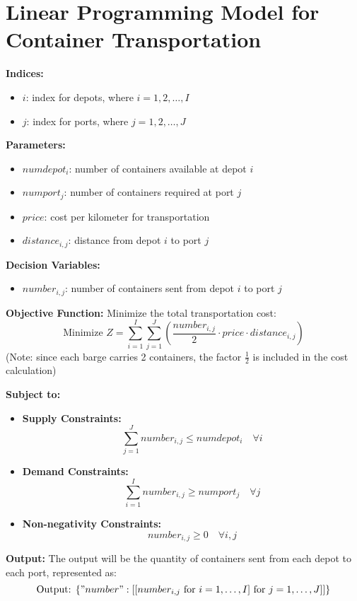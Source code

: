 \documentclass{article}
\begin{document}
\section*{Linear Programming Model for Container Transportation}

\textbf{Indices:}
\begin{itemize}
    \item $i$: index for depots, where $i = 1, 2, \ldots, I$
    \item $j$: index for ports, where $j = 1, 2, \ldots, J$
\end{itemize}

\textbf{Parameters:}
\begin{itemize}
    \item $numdepot_i$: number of containers available at depot $i$
    \item $numport_j$: number of containers required at port $j$
    \item $price$: cost per kilometer for transportation
    \item $distance_{i,j}$: distance from depot $i$ to port $j$
\end{itemize}

\textbf{Decision Variables:}
\begin{itemize}
    \item $number_{i,j}$: number of containers sent from depot $i$ to port $j$
\end{itemize}

\textbf{Objective Function:}
Minimize the total transportation cost:
\[
\text{Minimize } Z = \sum_{i=1}^{I} \sum_{j=1}^{J} \left( \frac{number_{i,j}}{2} \cdot price \cdot distance_{i,j} \right)
\]
(Note: since each barge carries 2 containers, the factor $\frac{1}{2}$ is included in the cost calculation)

\textbf{Subject to:}
\begin{itemize}
    \item \textbf{Supply Constraints:} 
    \[
    \sum_{j=1}^{J} number_{i,j} \leq numdepot_i \quad \forall i
    \]
    
    \item \textbf{Demand Constraints:}
    \[
    \sum_{i=1}^{I} number_{i,j} \geq numport_j \quad \forall j
    \]

    \item \textbf{Non-negativity Constraints:}
    \[
    number_{i,j} \geq 0 \quad \forall i,j
    \]
\end{itemize}

\textbf{Output:}
The output will be the quantity of containers sent from each depot to each port, represented as:
\[
\text{Output: } \{ "number": [[number_{i,j} \text{ for } i=1,\ldots,I] \text{ for } j=1,\ldots,J] ] \}
\]
\end{document}
